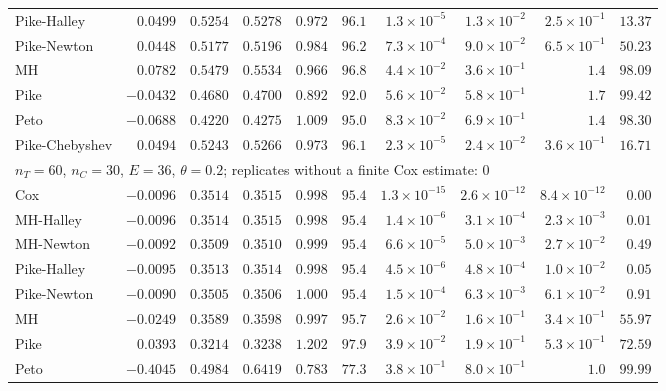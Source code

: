 \begin{landscape}
\begin{longtable}{lrrrrrrrrr}
Pike-Halley & $0.0499$ & $0.5254$ & $0.5278$ & $0.972$ & $96.1$ & $1.3 \times 10^{-5}$ & $1.3 \times 10^{-2}$ & $2.5 \times 10^{-1}$ & $13.37$ \\
Pike-Newton & $0.0448$ & $0.5177$ & $0.5196$ & $0.984$ & $96.2$ & $7.3 \times 10^{-4}$ & $9.0 \times 10^{-2}$ & $6.5 \times 10^{-1}$ & $50.23$ \\
MH & $0.0782$ & $0.5479$ & $0.5534$ & $0.966$ & $96.8$ & $4.4 \times 10^{-2}$ & $3.6 \times 10^{-1}$ & $1.4$ & $98.09$ \\
Pike & $-0.0432$ & $0.4680$ & $0.4700$ & $0.892$ & $92.0$ & $5.6 \times 10^{-2}$ & $5.8 \times 10^{-1}$ & $1.7$ & $99.42$ \\
Peto & $-0.0688$ & $0.4220$ & $0.4275$ & $1.009$ & $95.0$ & $8.3 \times 10^{-2}$ & $6.9 \times 10^{-1}$ & $1.4$ & $98.30$ \\
Pike-Chebyshev & $0.0494$ & $0.5243$ & $0.5266$ & $0.973$ & $96.1$ & $2.3 \times 10^{-5}$ & $2.4 \times 10^{-2}$ & $3.6 \times 10^{-1}$ & $16.71$ \\
\multicolumn{10}{l}{$n_T = 60$, $n_C = 30$, $E = 36$, $\theta = 0.2$; replicates without a finite Cox estimate: 0} \\
Cox & $-0.0096$ & $0.3514$ & $0.3515$ & $0.998$ & $95.4$ & $1.3 \times 10^{-15}$ & $2.6 \times 10^{-12}$ & $8.4 \times 10^{-12}$ & $0.00$ \\
MH-Halley & $-0.0096$ & $0.3514$ & $0.3515$ & $0.998$ & $95.4$ & $1.4 \times 10^{-6}$ & $3.1 \times 10^{-4}$ & $2.3 \times 10^{-3}$ & $0.01$ \\
MH-Newton & $-0.0092$ & $0.3509$ & $0.3510$ & $0.999$ & $95.4$ & $6.6 \times 10^{-5}$ & $5.0 \times 10^{-3}$ & $2.7 \times 10^{-2}$ & $0.49$ \\
Pike-Halley & $-0.0095$ & $0.3513$ & $0.3514$ & $0.998$ & $95.4$ & $4.5 \times 10^{-6}$ & $4.8 \times 10^{-4}$ & $1.0 \times 10^{-2}$ & $0.05$ \\
Pike-Newton & $-0.0090$ & $0.3505$ & $0.3506$ & $1.000$ & $95.4$ & $1.5 \times 10^{-4}$ & $6.3 \times 10^{-3}$ & $6.1 \times 10^{-2}$ & $0.91$ \\
MH & $-0.0249$ & $0.3589$ & $0.3598$ & $0.997$ & $95.7$ & $2.6 \times 10^{-2}$ & $1.6 \times 10^{-1}$ & $3.4 \times 10^{-1}$ & $55.97$ \\
Pike & $0.0393$ & $0.3214$ & $0.3238$ & $1.202$ & $97.9$ & $3.9 \times 10^{-2}$ & $1.9 \times 10^{-1}$ & $5.3 \times 10^{-1}$ & $72.59$ \\
Peto & $-0.4045$ & $0.4984$ & $0.6419$ & $0.783$ & $77.3$ & $3.8 \times 10^{-1}$ & $8.0 \times 10^{-1}$ & $1.0$ & $99.99$ \\

\end{longtable}
\end{landscape}
